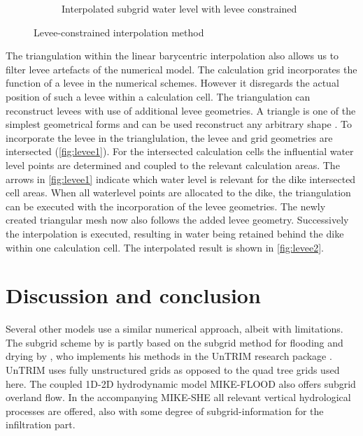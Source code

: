 \documentclass[a4paper]{article}
\begin{document}
\begin{figure}
\begin{subfigure}{0.45\textwidth}
    \caption{Interpolated subgrid water level with levee constrained}
    \label{fig:levee2}
  \end{subfigure}
  \label{fig:levees}

  \caption{Levee-constrained interpolation method}

\end{figure}

The triangulation within the linear barycentric interpolation also allows us to filter levee artefacts of the numerical model. The calculation grid incorporates the function of a levee in the numerical schemes. However it disregards the actual position of such a levee within a calculation cell. The triangulation can reconstruct levees with use of additional levee geometries. A triangle is one of the simplest geometrical forms and can be used reconstruct any arbitrary shape \citep{Welch1994}. To incorporate the levee in the trianglulation, the levee and grid geometries are intersected (\autoref{fig:levee1}). For the intersected calculation cells the influential water level points are determined and coupled to the relevant calculation areas. The arrows in \autoref{fig:levee1} indicate which water level is relevant for the dike intersected cell areas. When all waterlevel points are allocated to the dike, the triangulation can be executed with the incorporation of the levee geometries. The newly created triangular mesh now also follows the added levee geometry. Successively the interpolation is executed, resulting in water being retained behind the dike within one calculation cell. The interpolated result is shown in \autoref{fig:levee2}.



\section{Discussion and conclusion}
Several other models use a similar numerical approach, albeit with limitations. The subgrid scheme by \citet{Stelling2012} is partly based on the subgrid method for flooding and drying by \citet{Casulli2009}, who implements his methods in the UnTRIM research package \citet{Casulli2000}. UnTRIM uses fully unstructured grids as opposed to the quad tree grids used here. The coupled 1D-2D hydrodynamic model MIKE-FLOOD \citep{Dhi2014} also offers subgrid overland flow. In the accompanying MIKE-SHE all relevant vertical hydrological processes are offered, also with some degree of subgrid-information for the infiltration part.
\end{document}
